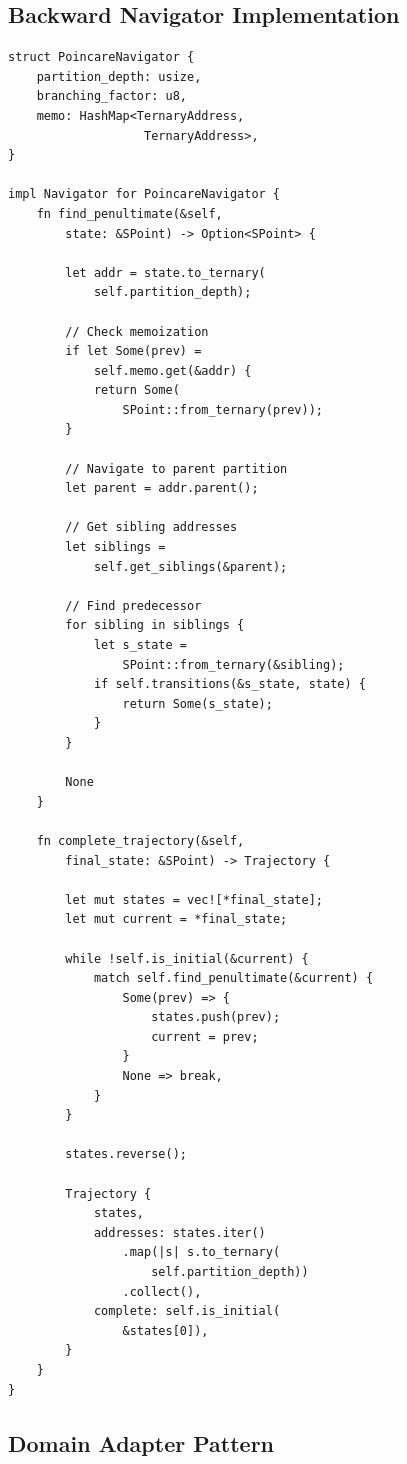 \documentclass[twocolumn,10pt]{article}
\begin{document}
\subsection{Backward Navigator Implementation}

\begin{verbatim}
struct PoincareNavigator {
    partition_depth: usize,
    branching_factor: u8,
    memo: HashMap<TernaryAddress,
                   TernaryAddress>,
}

impl Navigator for PoincareNavigator {
    fn find_penultimate(&self,
        state: &SPoint) -> Option<SPoint> {

        let addr = state.to_ternary(
            self.partition_depth);

        // Check memoization
        if let Some(prev) =
            self.memo.get(&addr) {
            return Some(
                SPoint::from_ternary(prev));
        }

        // Navigate to parent partition
        let parent = addr.parent();

        // Get sibling addresses
        let siblings =
            self.get_siblings(&parent);

        // Find predecessor
        for sibling in siblings {
            let s_state =
                SPoint::from_ternary(&sibling);
            if self.transitions(&s_state, state) {
                return Some(s_state);
            }
        }

        None
    }

    fn complete_trajectory(&self,
        final_state: &SPoint) -> Trajectory {

        let mut states = vec![*final_state];
        let mut current = *final_state;

        while !self.is_initial(&current) {
            match self.find_penultimate(&current) {
                Some(prev) => {
                    states.push(prev);
                    current = prev;
                }
                None => break,
            }
        }

        states.reverse();

        Trajectory {
            states,
            addresses: states.iter()
                .map(|s| s.to_ternary(
                    self.partition_depth))
                .collect(),
            complete: self.is_initial(
                &states[0]),
        }
    }
}
\end{verbatim}

\subsection{Domain Adapter Pattern}
\end{document}

